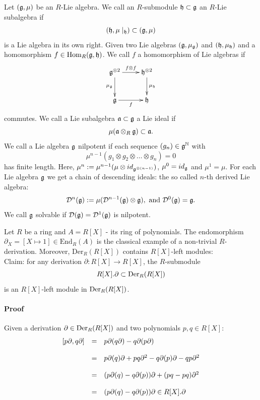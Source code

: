 \begin{defi}
Let $(\lieg,\mu)$ be an $R$-Lie algebra. We call an $R$-submodule $\lieh \subset \lieg$ an $R$-Lie subalgebra if
$$(\lieh,\mu\mid_{\frk{h}}) \subset (\lieg,\mu)$$
is a Lie algebra in its own right. Given two Lie algebras $(\lieg,\mu_{\lieg})$ and $(\lieh,\mu_{\lieh})$ and a homomorphism $f \in \mathrm{Hom}_R(\lieg,\lieh)$. We call $f$ a homomorphism of Lie algebras if
$$\xymatrix{
\lieg^{\otimes 2}\ar[r]^{f\otimes f}\ar[d]_{\mu_{\lieg}}&\lieh^{\otimes 2}\ar[d]^{\mu_{\lieh}}\\
\lieg \ar[r]_f& \lieh\\
}$$
commutes. We call a Lie subalgebra $\liea \subset \lieg$ a Lie ideal if
$$\mu(\liea \otimes_R \lieg) \subset \liea.$$
We call a Lie algebra $\lieg$ nilpotent if each sequence $(g_n) \in \lieg^{\nz}$ with
$$\mu^{n-1}(g_1 \otimes g_2 \otimes \ldots \otimes g_n) = 0$$
has finite length. Here, $\mu^n := \mu^{n-1}(\mu \otimes id_{\lieg^{\otimes (n - 1)}})$, $\mu^0 = id_\lieg$ and $\mu^1 = \mu$. For each Lie algebra $\lieg$ we get a chain of descending ideals: the so called $n$-th derived Lie algebra:
$$\mathcal{D}^n(\lieg) := \mu(\mathcal{D}^{n-1}(\lieg) \otimes \lieg),\ \mathrm{and}\ \mathcal{D}^0(\lieg) = \lieg.$$
We call $\lieg$ solvable if $\mathcal{D}(\lieg) = \mathcal{D}^1(\lieg)$ is nilpotent. 
\end{defi}

\bsp Let $R$ be a ring and $A = R[X]$ - its ring of polynomials. The endomorphism $\partial_X = [X \longmapsto 1] \in \mathrm{End}_R(A)$ is the classical example of a non-trivial $R$-derivation. Moreover, $\mathrm{Der}_R(R[X])$ contains $R[X]$-left modules:\\
\indent Claim: for any derivation $\partial : R[X] \longrightarrow R[X]$, the $R$-submodule
$$R[X].\partial \subset \der{R[X]}$$
is an $R[X]$-left module in $\der{R[X]}$.\\
\paragraph{Proof} Given a derivation $\partial \in \der{R[X]}$ and two polynomials $p, q \in R[X]$:
$$\bao{rcl}
[p \partial,q \partial] &=& p \partial(q \partial) - q \partial(p \partial)\\&&\\ &=& p \partial(q) \partial + p q \partial^2 - q \partial(p) \partial - q p \partial^2\\
&&\\
&=& (p \partial(q) - q \partial(p)) \partial + (p q - p q) \partial^2\\
&&\\
&=& (p \partial(q) - q \partial(p)) \partial \in R[X].\partial\\
\ea$$

